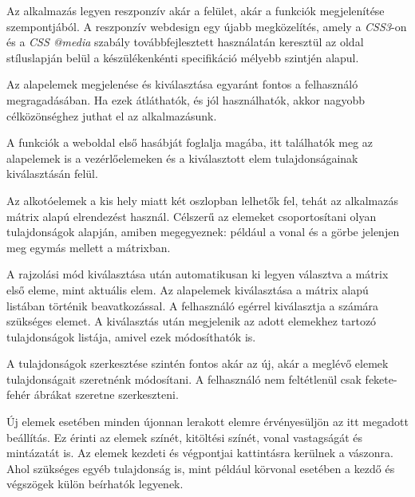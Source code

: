 Az alkalmazás legyen reszponzív akár a felület, akár a funkciók megjelenítése szempontjából. A reszponzív webdesign egy újabb megközelítés, amely a \textit{CSS3}-on és a \textit{CSS @media}\cite{css3media} szabály továbbfejlesztett használatán keresztül az oldal stíluslapján belül a készülékenkénti specifikáció mélyebb szintjén alapul. 


Az alapelemek megjelenése és kiválasztása egyaránt fontos a felhasználó megragadásában. Ha ezek átláthatók, és jól használhatók, akkor nagyobb célközönséghez juthat el az alkalmazásunk.


A funkciók a weboldal első hasábját foglalja magába, itt találhatók meg az alapelemek is a vezérlőelemeken és a kiválasztott elem tulajdonságainak kiválasztásán felül.  

Az alkotóelemek a kis hely miatt két oszlopban lelhetők fel, tehát az alkalmazás mátrix alapú elrendezést használ. Célszerű az elemeket csoportosítani olyan tulajdonságok alapján, amiben megegyeznek: például a vonal és a görbe jelenjen meg egymás mellett a mátrixban. 


A rajzolási mód kiválasztása után automatikusan ki legyen választva a mátrix első eleme, mint aktuális elem. Az alapelemek kiválasztása a mátrix alapú listában történik beavatkozással. A felhasználó egérrel kiválasztja a számára szükséges elemet. A kiválasztás után megjelenik az adott elemekhez tartozó tulajdonságok listája, amivel ezek módosíthatók is.


A tulajdonságok szerkesztése szintén fontos akár az új, akár a meglévő elemek tulajdonságait szeretnénk módosítani. A felhasználó nem feltétlenül csak fekete-fehér ábrákat szeretne szerkeszteni.


Új elemek esetében minden újonnan lerakott elemre érvényesüljön az itt megadott beállítás. Ez érinti az elemek színét, kitöltési színét, vonal vastagságát és mintázatát is. Az elemek kezdeti és végpontjai kattintásra kerülnek a vászonra. Ahol szükséges egyéb tulajdonság is, mint például körvonal esetében a kezdő és végszögek külön beírhatók legyenek.



